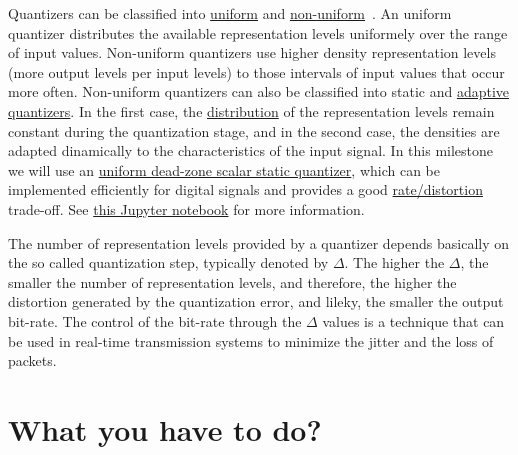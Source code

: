 Quantizers can be classified into
\href{https://en.wikipedia.org/wiki/Quantization_(signal_processing)#Mid-riser_and_mid-tread_uniform_quantizers}{uniform}
and
\href{https://nptel.ac.in/content/storage2/courses/117104069/chapter_5/5_5.html}{non-uniform}~\cite{sayood2017introduction,vetterli2014foundations}. An
uniform quantizer distributes the available representation levels
uniformely over the range of input values. Non-uniform quantizers use
higher density representation levels (more output levels per input
levels) to those intervals of input values that occur
more often. Non-uniform quantizers can also be classified into static
and
\href{https://en.wikipedia.org/wiki/Adaptive_differential_pulse-code_modulation}{adaptive
  quantizers}. In the first case, the
\href{https://en.wikipedia.org/wiki/Probability_distribution}{distribution}
of the representation levels remain constant during the quantization
stage, and in the second case, the densities are adapted dinamically
to the characteristics of the input signal. In this milestone we will
use an
\href{https://en.wikipedia.org/wiki/Quantization_(signal_processing)#Dead-zone_quantizers}{uniform
  dead-zone scalar static quantizer}, which can be implemented
efficiently for digital signals and provides a good
\href{https://en.wikipedia.org/wiki/Rate%E2%80%93distortion_theory}{rate/distortion}
trade-off. See \href{}{this Jupyter notebook} for more information.

The number of representation levels provided by a quantizer depends
basically on the so called quantization step, typically denoted by
$\Delta$. The higher the $\Delta$, the smaller the number of
representation levels, and therefore, the higher the distortion
generated by the quantization error, and lileky, the smaller the
output bit-rate. The control of the bit-rate through the $\Delta$
values is a technique that can be used in real-time transmission
systems to minimize the jitter and the loss of packets.

\section{What you have to do?}

